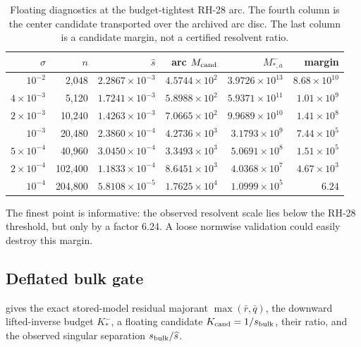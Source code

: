 \documentclass[11pt]{article}
\theoremstyle{definition}
\theoremstyle{remark}
\begin{document}
\begin{table}[H]
\centering
\small
\setlength{\tabcolsep}{5pt}
\caption{Floating diagnostics at the budget-tightest RH-28 arc.  The fourth
column is the center candidate transported over the archived arc disc.  The
last column is a candidate margin, not a certified resolvent ratio.}
\label{tab:original-gate}
\begin{tabular}{rrrrrr}
\toprule
$\sigma$ & $n$ & $\widehat s$ & arc $M_{\rm cand}$ & $M_{*,a}^-$ & margin \\
\midrule
$10^{-2}$ & 2,048 & $2.2867\times10^{-3}$ & $4.5744\times10^2$ & $3.9726\times10^{13}$ & $8.68\times10^{10}$ \\
$4\times10^{-3}$ & 5,120 & $1.7241\times10^{-3}$ & $5.8988\times10^2$ & $5.9371\times10^{11}$ & $1.01\times10^9$ \\
$2\times10^{-3}$ & 10,240 & $1.4263\times10^{-3}$ & $7.0665\times10^2$ & $9.9689\times10^{10}$ & $1.41\times10^8$ \\
$10^{-3}$ & 20,480 & $2.3860\times10^{-4}$ & $4.2736\times10^3$ & $3.1793\times10^9$ & $7.44\times10^5$ \\
$5\times10^{-4}$ & 40,960 & $3.0450\times10^{-4}$ & $3.3493\times10^3$ & $5.0691\times10^8$ & $1.51\times10^5$ \\
$2\times10^{-4}$ & 102,400 & $1.1833\times10^{-4}$ & $8.6451\times10^3$ & $4.0368\times10^7$ & $4.67\times10^3$ \\
$10^{-4}$ & 204,800 & $5.8108\times10^{-5}$ & $1.7625\times10^4$ & $1.0999\times10^5$ & $6.24$ \\
\bottomrule
\end{tabular}
\end{table}

The finest point is informative: the observed resolvent scale lies below
the RH-28 threshold, but only by a factor 6.24.  A loose normwise validation
could easily destroy this margin.

\subsection{Deflated bulk gate}

 gives the exact stored-model residual majorant
$\max(\bar r,\bar q)$, the downward lifted-inverse budget $K_*^-$, a floating
candidate $K_{\rm cand}=1/s_{\rm bulk}$, their ratio, and the observed
singular separation $s_{\rm bulk}/\widehat s$.
\end{document}
